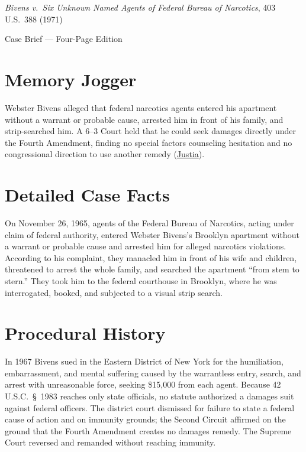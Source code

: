 \documentclass[12pt]{article}
\begin{document}
\begin{center}
{\LARGE \textit{Bivens v.\ Six Unknown Named Agents of Federal Bureau of Narcotics}, 403 U.S.\ 388 (1971)\par}
\vspace{0.8em}
{\large Case Brief --- Four-Page Edition\par}
\end{center}
\vspace{1em}

\section{Memory Jogger}

Webster Bivens alleged that federal narcotics agents entered his apartment without a warrant or probable cause, arrested him in front of his family, and strip-searched him. A 6--3 Court held that he could seek damages directly under the Fourth Amendment, finding no special factors counseling hesitation and no congressional direction to use another remedy (\href{https://supreme.justia.com/cases/federal/us/403/388/}{Justia}).

\section{Detailed Case Facts}

On November 26, 1965, agents of the Federal Bureau of Narcotics, acting under claim of federal authority, entered Webster Bivens's Brooklyn apartment without a warrant or probable cause and arrested him for alleged narcotics violations. According to his complaint, they manacled him in front of his wife and children, threatened to arrest the whole family, and searched the apartment ``from stem to stern.'' They took him to the federal courthouse in Brooklyn, where he was interrogated, booked, and subjected to a visual strip search.

\section{Procedural History}

In 1967 Bivens sued in the Eastern District of New York for the humiliation, embarrassment, and mental suffering caused by the warrantless entry, search, and arrest with unreasonable force, seeking \$15,000 from each agent. Because 42 U.S.C.\ \S~1983 reaches only state officials, no statute authorized a damages suit against federal officers. The district court dismissed for failure to state a federal cause of action and on immunity grounds; the Second Circuit affirmed on the ground that the Fourth Amendment creates no damages remedy. The Supreme Court reversed and remanded without reaching immunity.
\end{document}
